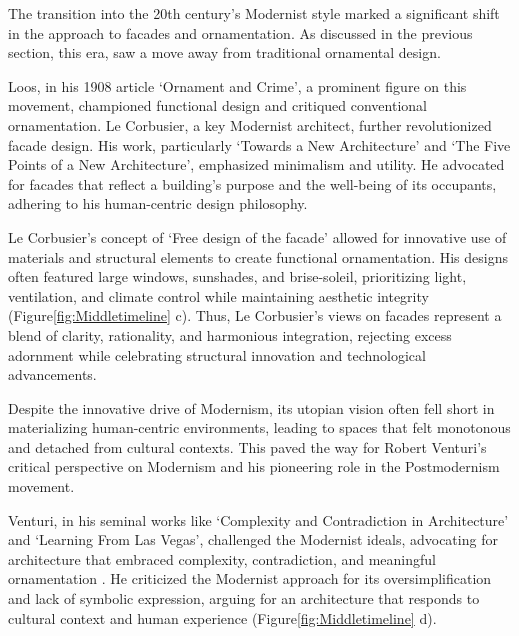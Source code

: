 
The transition into the 20th century's Modernist style marked a significant shift in the approach to facades and ornamentation.
As discussed in the previous section, this era, saw a move away from traditional ornamental design.

Loos, in his 1908 article `Ornament and Crime', a prominent figure on this movement, championed functional design and critiqued conventional ornamentation\cite{Saglam2014}.
Le Corbusier, a key Modernist architect, further revolutionized facade design.
His work, particularly `Towards a New Architecture'\cite{Studio2a2023} and `The Five Points of a New Architecture', emphasized minimalism and utility.
He advocated for facades that reflect a building's purpose and the well-being of its occupants, adhering to his human-centric design philosophy\cite{Virseda2021}.

Le Corbusier's concept of `Free design of the facade'\cite{Corbusier1986} allowed for innovative use of materials and structural elements to create functional ornamentation.
His designs often featured large windows, sunshades, and brise-soleil, prioritizing light, ventilation, and climate control while maintaining aesthetic integrity (Figure\ref{fig:Middletimeline} c).
Thus, Le Corbusier's views on facades represent a blend of clarity, rationality, and harmonious integration, rejecting excess adornment while celebrating structural innovation and technological advancements.


Despite the innovative drive of Modernism, its utopian vision often fell short in materializing human-centric environments, leading to spaces that felt monotonous and detached from cultural contexts.
This paved the way for Robert Venturi's critical perspective on Modernism and his pioneering role in the Postmodernism movement.

Venturi, in his seminal works like `Complexity and Contradiction in Architecture' and `Learning From Las Vegas', challenged the Modernist ideals, advocating for architecture that embraced complexity, contradiction, and meaningful ornamentation \cite{Venturi1977}.
He criticized the Modernist approach for its oversimplification and lack of symbolic expression, arguing for an architecture that responds to cultural context and human experience (Figure\ref{fig:Middletimeline} d).



